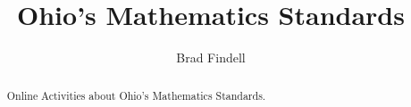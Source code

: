 \documentclass[numbers,nooutcomes,twoside,hints]{xourse}
\title{Ohio's Mathematics Standards}
\author{Brad Findell}
\begin{document}
\begin{abstract}
Online Activities about Ohio's Mathematics Standards.
\end{abstract}
\maketitle






\end{document}
